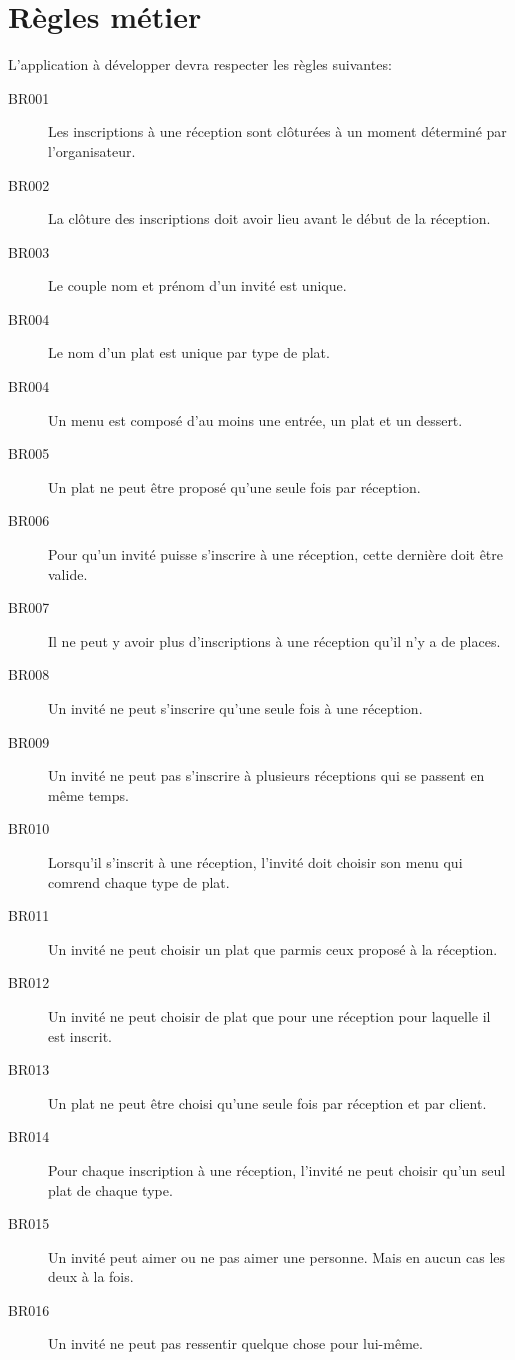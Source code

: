 \chapter{Règles métier}
\label{chapter_business_rules}

L'application à développer devra respecter les règles suivantes:

\begin{description}
  \item[BR001]  Les inscriptions à une réception sont clôturées à un moment déterminé par l'organisateur.
  \item[BR002]  La clôture des inscriptions doit avoir lieu avant le début de la réception.
  \item[BR003]  Le couple nom et prénom d'un invité est unique.
  \item[BR004]  Le nom d'un plat est unique par type de plat.
  \item[BR004]  Un menu est composé d'au moins une entrée, un plat et un dessert.
  \item[BR005]  Un plat ne peut être proposé qu'une seule fois par réception.
  \item[BR006]  Pour qu'un invité puisse s'inscrire à une réception, cette dernière doit être valide.
  \item[BR007]  Il ne peut y avoir plus d'inscriptions à une réception qu'il n'y a de places.
  \item[BR008]  Un invité ne peut s'inscrire qu'une seule fois à une réception.
  \item[BR009]  Un invité ne peut pas s'inscrire à plusieurs réceptions qui se passent en même temps.
  \item[BR010]  Lorsqu'il s'inscrit à une réception, l'invité doit choisir son menu qui comrend chaque type de plat.
  \item[BR011]  Un invité ne peut choisir un plat que parmis ceux proposé à la réception.
  \item[BR012]  Un invité ne peut choisir de plat que pour une réception pour laquelle il est inscrit.
  \item[BR013]  Un plat ne peut être choisi qu'une seule fois par réception et par client.
  \item[BR014]  Pour chaque inscription à une réception, l'invité ne peut choisir qu'un seul plat de chaque type.
  \item[BR015]  Un invité peut aimer ou ne pas aimer une personne. Mais en aucun cas les deux à la fois.
  \item[BR016]  Un invité ne peut pas ressentir quelque chose pour lui-même.

\end{description}
